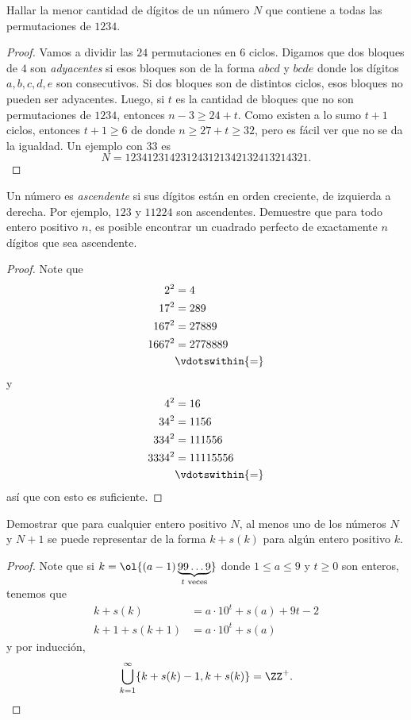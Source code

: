 \begin{probEG}
  Hallar la menor cantidad de dígitos de un número $N$ que contiene a todas las
  permutaciones de $1234$.
\end{probEG}

\begin{proof}
  Vamos a dividir las $24$ permutaciones en $6$ ciclos. Digamos que dos bloques
  de $4$ son \emph{adyacentes} si esos bloques son de la forma $abcd$ y $bcde$
  donde los dígitos $a,b,c,d,e$ son consecutivos. Si dos bloques son de
  distintos ciclos, esos bloques no pueden ser adyacentes. Luego, si $t$ es la
  cantidad de bloques que no son permutaciones de $1234$, entonces
  $n-3\ge 24+t$. Como existen a lo sumo $t+1$ ciclos, entonces $t+1\ge 6$ de
  donde $n\ge 27+t\ge 32$, pero es fácil ver que no se da la igualdad. Un
  ejemplo con $33$ es
  \[N=123412314231243121342132413214321.\]
\end{proof}

\begin{probEG}
  Un número es \emph{ascendente} si sus dígitos están en orden creciente, de
  izquierda a derecha. Por ejemplo, $123$ y $11224$ son ascendentes. Demuestre
  que para todo entero positivo $n$, es posible encontrar un cuadrado perfecto
  de exactamente $n$ dígitos que sea ascendente.
\end{probEG}

\begin{proof}
  Note que
  \begin{align*}
    2^2    &= 4 \\
    17^2   &= 289 \\
    167^2  &= 27889 \\
    1667^2 &= 2778889 \\
    &\vdotswithin{=}
  \end{align*}
  y
  \begin{align*}
    4^2    &= 16 \\
    34^2   &= 1156 \\
    334^2  &= 111556 \\
    3334^2 &= 11115556 \\
    &\vdotswithin{=}
  \end{align*}
  así que con esto es suficiente.
\end{proof}

\begin{probEG}
  Demostrar que para cualquier entero positivo $N$, al menos uno de los números
  $N$ y $N+1$ se puede representar de la forma $k+s(k)$ para algún entero
  positivo $k$.
\end{probEG}

\begin{proof}
  Note que si $k=\ol{(a-1)\underbrace{99\dots 9}_{t\text{ veces}}}$ donde
  $1\le a\le 9$ y $t\ge 0$ son enteros, tenemos que
  \begin{align*}
    k+s(k)     &= a\cdot 10^t+s(a)+9t-2 \\
    k+1+s(k+1) &= a\cdot 10^t+s(a)
  \end{align*}
  y por inducción,
  \[\bigcup_{k=1}^\infty\{k+s(k)-1,k+s(k)\}=\ZZ^+.\]
\end{proof}
